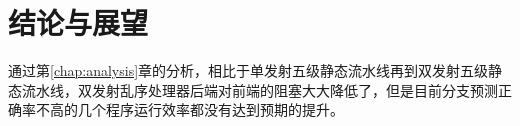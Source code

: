\chapter{结论与展望}\label{chap:future}


通过第\ref{chap:analysis}章的分析，相比于单发射五级静态流水线再到双发射五级静态流水线，双发射乱序处理器后端对前端的阻塞大大降低了，但是目前分支预测正确率不高的几个程序运行效率都没有达到预期的提升。

